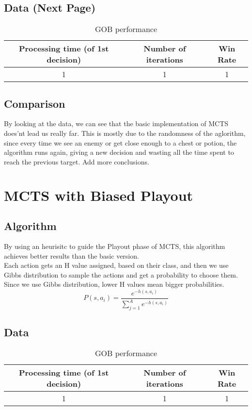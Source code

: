 \documentclass{article}
\begin{document}
  \subsection{Data (Next Page)}
  \begin{table}[h!]
    \centering
    \caption{GOB performance}
    \label{tab:tableGOB1}
    \begin{tabular}{c|c|c}
      \textbf{Processing time (of 1st decision)} & \textbf{Number of iterations} & \textbf{Win Rate}\\
      \hline
      1 & 1 & 1
    \end{tabular}
  \end{table}

  \subsection{Comparison}
  By looking at the data, we can see that the basic implementation of MCTS does'nt lead us really far. This is mostly due to the randomness of the aglorithm, 
  since every time we see an enemy or get close enough to a chest or potion, the algorithm runs again, giving a new decision and wasting all 
  the time spent to reach the previous target.
  Add more conclusions.\\

  \section{MCTS with Biased Playout}
  \subsection{Algorithm}
  By using an heurisitc to guide the Playout phase of MCTS, this algorithm achieves better results than the basic version.\\
   Each action gets an H value assigned, based on their class, and then we use Gibbs distribution to sample the actions and get a probability to choose them. 
   Since we use Gibbs distribution, lower H values mean bigger probabilities.\\
   \[P(s,a_i) = \frac{e^{-h(s, a_i)}}{\sum_{j=1}^{A}e^{-h(s, a_i)}}\]
  
  \subsection{Data}
  \begin{table}[h!]
    \centering
    \caption{GOB performance}
    \label{tab:tableGOB1}
    \begin{tabular}{c|c|c}
      \textbf{Processing time (of 1st decision)} & \textbf{Number of iterations} & \textbf{Win Rate}\\
      \hline
      1 & 1 & 1
    \end{tabular}
  \end{table}
\end{document}
